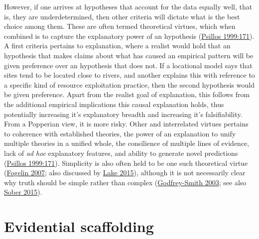\documentclass[
  12pt,
  a4paper,
  oneside]{book}
\begin{document}
However, if one arrives at hypotheses that account for the data equally well, that is, they are underdetermined, then other criteria will dictate what is the best choice among them. These are often termed theoretical virtues, which when combined is to capture the explanatory power of an hypothesis (\protect\hyperlink{ref-psillos1999}{Psillos 1999:171}). A first criteria pertains to explanation, where a realist would hold that an hypothesis that makes claims about what has caused an empirical pattern will be given preference over an hypothesis that does not. If a locational model says that sites tend to be located close to rivers, and another explains this with reference to a specific kind of resource exploitation practice, then the second hypothesis would be given preference. Apart from the realist goal of explanation, this follows from the additional empirical implications this causal explanation holds, thus potentially increasing it's explanatory breadth and increasing it's falsifiability. From a Popperian view, it is more risky. Other and interrelated virtues pertains to coherence with established theories, the power of an explanation to unify multiple theories in a unified whole, the consilience of multiple lines of evidence, lack of \emph{ad hoc} explanatory features, and ability to generate novel predictions (\protect\hyperlink{ref-psillos1999}{Psillos 1999:171}). Simplicity is also often held to be one such theoretical virtue (\protect\hyperlink{ref-fogelin2007}{Fogelin 2007}; also discussed by \protect\hyperlink{ref-lake2015}{Lake 2015}), although it is not necessarily clear why truth should be simple rather than complex (\protect\hyperlink{ref-godfrey-smith2003}{Godfrey-Smith 2003}; see also \protect\hyperlink{ref-sober2015}{Sober 2015}).

\hypertarget{evidential-scaffolding}{%
\section{Evidential scaffolding}\label{evidential-scaffolding}}
\end{document}
